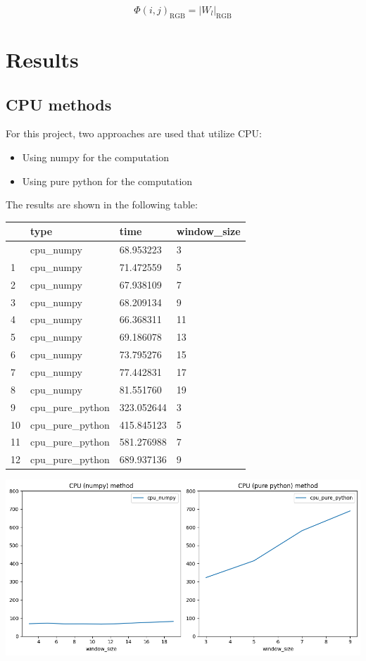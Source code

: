 \documentclass[
  10pt,
  a4paper,
  a4paper]{article}
\providecommand{\tightlist}{%
  \setlength{\itemsep}{0pt}\setlength{\parskip}{0pt}}\usepackage{longtable,booktabs,array}
\begin{document}
\[\Phi(i, j)_{\text{RGB}} = \left| W_l \right|_{\text{RGB}}\]

\hypertarget{results}{%
\section{Results}\label{results}}

\hypertarget{cpu-methods}{%
\subsection{CPU methods}\label{cpu-methods}}

For this project, two approaches are used that utilize CPU:

\begin{itemize}
\tightlist
\item
  Using numpy for the computation
\item
  Using pure python for the computation
\end{itemize}

The results are shown in the following table:

\begin{longtable}[]{@{}llll@{}}
\toprule\noalign{}
& type & time & window\_size \\
\midrule\noalign{}
\endhead
\bottomrule\noalign{}
\endlastfoot
0 & cpu\_numpy & 68.953223 & 3 \\
1 & cpu\_numpy & 71.472559 & 5 \\
2 & cpu\_numpy & 67.938109 & 7 \\
3 & cpu\_numpy & 68.209134 & 9 \\
4 & cpu\_numpy & 66.368311 & 11 \\
5 & cpu\_numpy & 69.186078 & 13 \\
6 & cpu\_numpy & 73.795276 & 15 \\
7 & cpu\_numpy & 77.442831 & 17 \\
8 & cpu\_numpy & 81.551760 & 19 \\
9 & cpu\_pure\_python & 323.052644 & 3 \\
10 & cpu\_pure\_python & 415.845123 & 5 \\
11 & cpu\_pure\_python & 581.276988 & 7 \\
12 & cpu\_pure\_python & 689.937136 & 9 \\
\end{longtable}

\includegraphics{Report.10.kuwahara_files/figure-pdf/cell-5-output-1.png}
\end{document}
